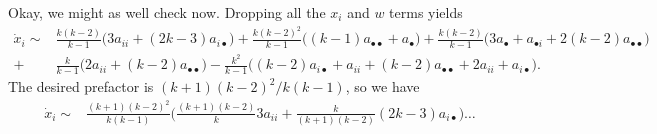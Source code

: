 \documentclass[14pt, a4paper, justified]{article}
\begin{document}
Okay, we might as well check now.
Dropping all the $x_i$ and $w$ terms yields
\begin{equation}
    \begin{split}
        \dot{x}_i \sim & \frac{k(k-2)}{k-1} \Big( 3a_{ii} + (2k - 3) a_{i \bullet} \Big) + \frac{k(k-2)^2}{k-1} \Big( (k-1) a_{\bullet \bullet} + a_{\bullet} \Big) + \frac{k(k-2)}{k-1}\Big( 3a_{\bullet} + a_{\bullet i} + 2(k-2)a_{\bullet \bullet} \Big)
        \\
        + & \frac{k}{k-1} \Big( 2a_{ii} + (k-2) a_{\bullet \bullet} \Big) - \frac{k^2}{k-1} \Big( (k-2) a_{i \bullet} + a_{ii} + (k-2) a_{\bullet \bullet} + 2a_{ii} + a_{i \bullet} \Big).
    \end{split}
\end{equation}
The desired prefactor is $(k+1)(k-2)^2/k(k-1)$, so we have
\begin{equation}
    \begin{split}
        \dot{x}_i \sim & \frac{(k+1)(k-2)^2}{k(k-1)} \Big( \frac{(k+1)(k-2)}{k} 3a_{ii} + \frac{k}{(k+1)(k-2)} (2k-3) a_{i \bullet} \Big) \ldots
    \end{split}
\end{equation}
%
\end{document}
